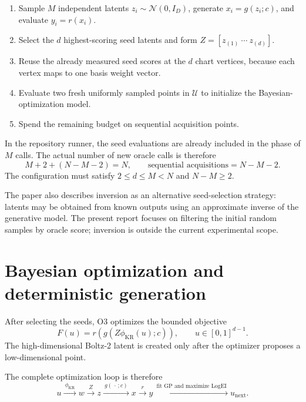 \documentclass[11pt]{article}
\DeclareMathOperator{\LogEI}{LogEI}
\begin{document}
\begin{enumerate}
    \item Sample \(M\) independent latents \(z_i\sim\mathcal{N}(0,I_D)\),
          generate \(x_i=g(z_i;c)\), and evaluate \(y_i=r(x_i)\).
    \item Select the \(d\) highest-scoring seed latents and form
          \(Z=[z_{(1)}\ \cdots\ z_{(d)}]\).
    \item Reuse the already measured seed scores at the \(d\) chart vertices,
          because each vertex maps to one basis weight vector.
    \item Evaluate two fresh uniformly sampled points in \(\mathcal{U}\) to
          initialize the Bayesian-optimization model.
    \item Spend the remaining budget on sequential acquisition points.
\end{enumerate}

In the repository runner, the seed evaluations are already included in the
phase of \(M\) calls.  The actual number of new oracle calls is therefore
\begin{equation}
    M+2+(N-M-2)=N,
    \qquad
    \text{sequential acquisitions}=N-M-2.
    \label{eq:budget-accounting}
\end{equation}
The configuration must satisfy \(2\leq d\leq M<N\) and \(N-M\geq 2\).

The paper also describes inversion as an alternative seed-selection strategy:
latents may be obtained from known outputs using an approximate inverse of the
generative model.  The present report focuses on filtering the initial random
samples by oracle score; inversion is outside the current experimental scope.

\section{Bayesian optimization and deterministic generation}
\label{sec:bo}

After selecting the seeds, O3 optimizes the bounded objective
\begin{equation}
    F(u)=r\!\left(g\!\left(Z\phi_{\mathrm{KR}}(u);c\right)\right),
    \qquad u\in[0,1]^{d-1}.
    \label{eq:surrogate-objective}
\end{equation}
The high-dimensional Boltz-2 latent is created only after the optimizer
proposes a low-dimensional point.

The complete optimization loop is therefore
\begin{equation}
    u
    \xrightarrow{\ \phi_{\mathrm{KR}}\ } w
    \xrightarrow{\ Z\ } z
    \xrightarrow{\ g(\,\cdot\,;c)\ } x
    \xrightarrow{\ r\ } y
    \xrightarrow{\ \text{fit GP and maximize }\LogEI\ }
    u_{\mathrm{next}}.
    \label{eq:canonical-pipeline}
\end{equation}
\end{document}
